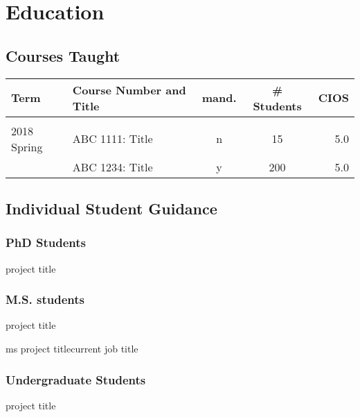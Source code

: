 \section{Education}
\label{sec:teaching}

\subsection{Courses Taught}
\label{subsec:courses}

\begin{longtable}{p{}p{}ccr}
\textbf{Term} & \textbf{Course Number and Title} & \textbf{mand.} & \textbf{\# Students} & \textbf{CIOS}  \\ 
\endhead
\hline \\%
2018 Spring & {ABC 1111}: Title &n& 15 & 5.0 \\
            & {ABC 1234}: Title &y& 200 & 5.0 \\
\end{longtable}


\subsection{Individual Student Guidance}
\label{subsec:individual}
    \subsubsection{PhD Students}
        \begin{subnum}
            {project title}
        \end{subnum}

    \subsubsection{M.S. students}
        \begin{subnum}
            {project title}

            {ms project title}{current job title}
        \end{subnum}

    \subsubsection{Undergraduate Students}
        \begin{subnum}
            {project title}
        \end{subnum}

